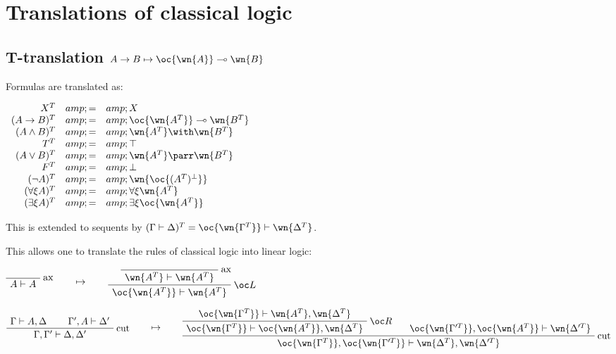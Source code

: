 \chapter{Translations of classical logic}\label{translations-of-classical-logic}

\section{\texorpdfstring{T-translation \(A\imp B \mapsto \oc{\wn{A}}\limp\wn{B}\)}{T-translation A\textbackslash{}imp B \textbackslash{}mapsto \textbackslash{}oc\{\textbackslash{}wn\{A\}\}\textbackslash{}limp\textbackslash{}wn\{B\}}}\label{t-translation-aimp-b-mapsto-ocwnalimpwnb}

Formulas are translated as:

\(\begin{array}{rcl}
X^T &amp; = &amp; X \\
(A\imp B)^T &amp; = &amp; \oc{\wn{A^T}}\limp\wn{B^T} \\
(A\wedge B)^T &amp; = &amp; \wn{A^T} \with \wn{B^T} \\
T^T &amp; = &amp; \top \\
(A\vee B)^T &amp; = &amp; \wn{A^T}\parr\wn{B^T} \\
F^T &amp; = &amp; \bot \\
(\neg A)^T &amp; = &amp; \wn{\oc{(A^T)\orth}} \\
(\forall\xi A)^T &amp; = &amp; \forall\xi \wn{A^T} \\
(\exists\xi A)^T &amp; = &amp; \exists\xi \oc{\wn{A^T}}
\end{array}\)

This is extended to sequents by
\((\Gamma\vdash\Delta)^T = \oc{\wn{\Gamma^T}}\vdash\wn{\Delta^T}\).

This allows one to translate the rules of classical logic into linear
logic:

\(\LabelRule{\rulename{ax}}
\NulRule{A\vdash A}
\DisplayProof
\qquad\mapsto\qquad
\LabelRule{\rulename{ax}}
\NulRule{\wn{A^T}\vdash\wn{A^T}}
\LabelRule{\oc L}
\UnaRule{\oc{\wn{A^T}}\vdash\wn{A^T}}
\DisplayProof\)

\(\AxRule{\Gamma\vdash A,\Delta}
\AxRule{\Gamma',A\vdash\Delta'}
\LabelRule{\rulename{cut}}
\BinRule{\Gamma,\Gamma'\vdash\Delta,\Delta'}
\DisplayProof
\qquad\mapsto\qquad
\AxRule{\oc{\wn{\Gamma^T}}\vdash\wn{A^T},\wn{\Delta^T}}
\LabelRule{\oc R}
\UnaRule{\oc{\wn{\Gamma^T}}\vdash\oc{\wn{A^T}},\wn{\Delta^T}}
\AxRule{\oc{\wn{\Gamma'^T}},\oc{\wn{A^T}}\vdash\wn{\Delta'^T}}
\LabelRule{\rulename{cut}}
\BinRule{\oc{\wn{\Gamma^T}},\oc{\wn{\Gamma'^T}}\vdash\wn{\Delta^T},\wn{\Delta'^T}}
\DisplayProof\)

